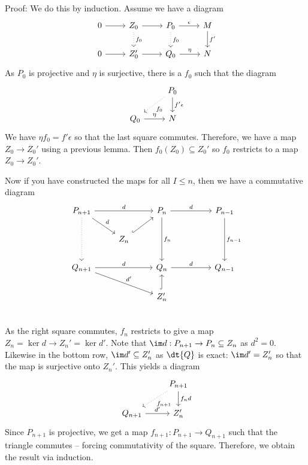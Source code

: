 Proof: We do this by induction. Assume we have a diagram
\[
\begin{tikzcd}
0 \arrow{r} & Z_0 \arrow{r} \arrow[dotted]{d}{f_0} & P_0 \arrow[dotted]{d}{f_0} \arrow{r}{\epsilon} & M \arrow{d}{f'} \\
0 \arrow{r} & Z_0' \arrow{r} & Q_0 \arrow{r}{\eta} & N
\end{tikzcd}
\]
As $P_0$ is projective and $\eta$ is surjective, there is a $f_0$ such that the diagram
\[
\begin{tikzcd}
\phantom{x} & P_0 \arrow[dotted]{dl}{f_0} \arrow{d}{f' \epsilon} \\
Q_0 \arrow{r}{\eta} & N 
\end{tikzcd}
\]
We have $\eta f_0 =f'\epsilon$ so that the last square commutes. Therefore, we have a map $Z_0 \to Z_0'$ using a previous lemma. Then $f_0(Z_0) \subseteq Z_0'$ so $f_0$ restricts to a map $Z_0 \to Z_0'$.

Now if you have constructed the maps for all $I \leq n$, then we have a commutative diagram
\[
\begin{tikzcd}
P_{n+1} \arrow{rr}{d} \arrow{dr}{d} \arrow[dotted]{dd} & & P_n \arrow{rr}{d} \arrow{dd}{f_n} & & P_{n-1} \arrow{dd}{f_{n-1}} \\
 & Z_n \arrow[hook]{ur} & & & \\
Q_{n+1} \arrow{rr}{d} \arrow{drr}{d'} & & Q_n \arrow{rr}{d} & & Q_{n-1} \\ 
 &  & Z_n' \arrow[hook]{u}& & \\
\end{tikzcd}
\]
As the right square commutes, $f_n$ restricts to give a map $Z_n=\ker d \to Z_n'= \ker d'$. Note that $\im d: P_{n+1} \to P_n \subseteq Z_n$ as $d^2=0$. Likewise in the bottom row, $\im d' \subseteq Z_n'$ as $\dt{Q}$ is exact: $\im d'=Z_n'$ so that the map is surjective onto $Z_n'$. This yields a diagram
\[
\begin{tikzcd}
\phantom{x} & P_{n+1} \arrow[dotted]{dl}{f_{n+1}} \arrow{d}{f_n d} \\
Q_{n+1} \arrow{r}{d'} & Z_n'
\end{tikzcd}
\]
Since $P_{n+1}$ is projective, we get a map $f_{n+1}: P_{n+1} \to Q_{n+1}$ such that the triangle commutes -- forcing commutativity of the square. Therefore, we obtain the result via induction. 

